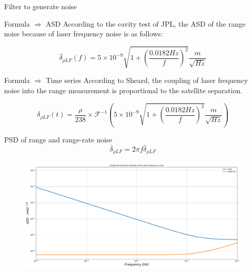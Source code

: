 \documentclass[12pt,english,ignorenonframetext,]{beamer}
\begin{document}
\begin{frame}{Filter to generate noise}
	\begin{block}{Formula $\Longrightarrow$ ASD}
		According to the cavity test of JPL, the ASD of the range noise because of laser frequency noise is as follows:
		
		\begin{equation}
			\bar{\delta}_{\rho LF}( f ) =5\times 10^{-9}\sqrt{1+\left( \frac{0.0182Hz}{f} \right) ^2}\frac{m}{\sqrt{Hz}}
		\end{equation}
	\end{block}
	\begin{block}{Formula $\Longrightarrow$ Time series}
		According to Sheard, the coupling of laser frequency noise into the range measurement is proportional to the satellite separation.
		
		\begin{equation}
			\delta _{\rho LF}( t ) =\frac{\rho}{238}\times \mathcal{F}^{-1}( 5\times 10^{-9}\sqrt{1+( \frac{0.0182Hz}{f} ) ^2}\frac{m}{\sqrt{Hz}}) 
		\end{equation}
	\end{block}
\end{frame}

\begin{frame}{PSD of range and range-rate noise}
	\begin{equation}
		\bar{\delta}_{\dot{\rho}LF}=2\pi f\bar{\delta}_{\rho LF}
	\end{equation}
	\begin{figure}
		\includegraphics{..//images//laser_frequency_spectrum.png}
	\end{figure}
\end{frame}
\end{document}
